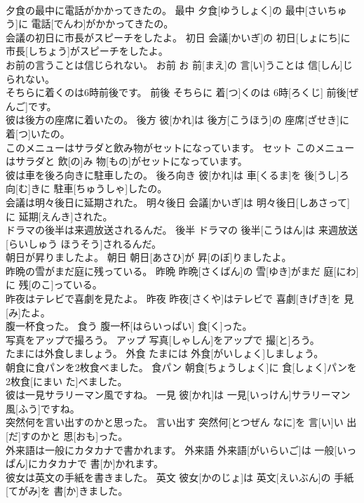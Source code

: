 \documentclass[8pt]{extreport}
\begin{document}
\begin{CJK}{UTF8}{min}
\\	夕食の最中に電話がかかってきたの。	最中	夕食[ゆうしょく]の 最中[さいちゅう]に 電話[でんわ]がかかってきたの。	
\\	会議の初日に市長がスピーチをしたよ。	初日	会議[かいぎ]の 初日[しょにち]に 市長[しちょう]がスピーチをしたよ。	
\\	お前の言うことは信じられない。	お前	お 前[まえ]の 言[い]うことは 信[しん]じられない。	
\\	そちらに着くのは6時前後です。	前後	そちらに 着[つ]くのは 6時[ろくじ] 前後[ぜんご]です。	
\\	彼は後方の座席に着いたの。	後方	彼[かれ]は 後方[こうほう]の 座席[ざせき]に 着[つ]いたの。	
\\	このメニューはサラダと飲み物がセットになっています。	セット	このメニューはサラダと 飲[の]み 物[もの]がセットになっています。	
\\	彼は車を後ろ向きに駐車したの。	後ろ向き	彼[かれ]は 車[くるま]を 後[うし]ろ 向[む]きに 駐車[ちゅうしゃ]したの。	
\\	会議は明々後日に延期された。	明々後日	会議[かいぎ]は 明々後日[しあさって]に 延期[えんき]された。	
\\	ドラマの後半は来週放送されるんだ。	後半	ドラマの 後半[こうはん]は 来週放送[らいしゅう ほうそう]されるんだ。	
\\	朝日が昇りましたよ。	朝日	朝日[あさひ]が 昇[のぼ]りましたよ。	
\\	昨晩の雪がまだ庭に残っている。	昨晩	昨晩[さくばん]の 雪[ゆき]がまだ 庭[にわ]に 残[のこ]っている。	
\\	昨夜はテレビで喜劇を見たよ。	昨夜	昨夜[さくや]はテレビで 喜劇[きげき]を 見[み]たよ。	
\\	腹一杯食った。	食う	腹一杯[はらいっぱい] 食[く]った。	
\\	写真をアップで撮ろう。	アップ	写真[しゃしん]をアップで 撮[と]ろう。	
\\	たまには外食しましょう。	外食	たまには 外食[がいしょく]しましょう。	
\\	朝食に食パンを2枚食べました。	食パン	朝食[ちょうしょく]に 食[しょく]パンを 2枚食[にまい た]べました。	
\\	彼は一見サラリーマン風ですね。	一見	彼[かれ]は 一見[いっけん]サラリーマン 風[ふう]ですね。	
\\	突然何を言い出すのかと思った。	言い出す	突然何[とつぜん なに]を 言[い]い 出[だ]すのかと 思[おも]った。	
\\	外来語は一般にカタカナで書かれます。	外来語	外来語[がいらいご]は 一般[いっぱん]にカタカナで 書[か]かれます。	
\\	彼女は英文の手紙を書きました。	英文	彼女[かのじょ]は 英文[えいぶん]の 手紙[てがみ]を 書[か]きました。	

\end{CJK}
\end{document}

